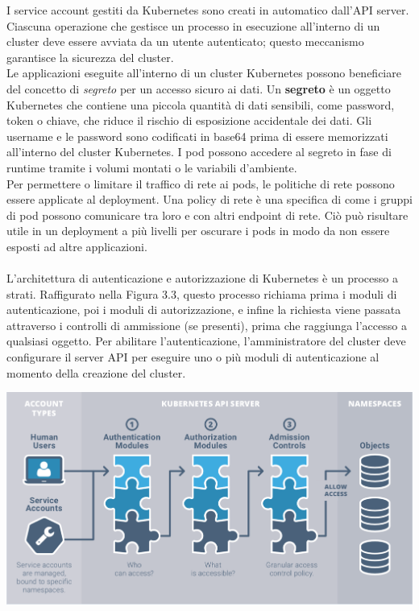 \documentclass[12pt, a4paper]{report}
\begin{document}
I service account gestiti da Kubernetes sono creati in automatico dall'API server. Ciascuna operazione che gestisce un processo in esecuzione all'interno di un cluster deve essere avviata da un utente autenticato; questo meccanismo garantisce la sicurezza del cluster.\\
Le applicazioni eseguite all'interno di un cluster Kubernetes possono beneficiare del concetto di \textit{segreto} per un accesso sicuro ai dati. Un \textbf{segreto} è un oggetto Kubernetes che contiene una piccola quantità di dati sensibili, come password, token o chiave, che riduce il rischio di esposizione accidentale dei dati. Gli username e le password sono codificati in base64 prima di essere memorizzati all'interno del cluster Kubernetes. I pod possono accedere al segreto in fase di runtime tramite i volumi montati o le variabili d'ambiente.\\
Per permettere o limitare il traffico di rete ai pods, le politiche di rete possono essere applicate al deployment. Una policy di rete è una specifica di come i gruppi di pod possono comunicare tra loro e con altri endpoint di rete. Ciò può risultare utile in un deployment a più livelli per oscurare i pods in modo da non essere esposti ad altre applicazioni.\\
\\
L'architettura di autenticazione e autorizzazione di Kubernetes è un processo a strati. Raffigurato nella Figura 3.3, questo processo richiama prima i moduli di autenticazione, poi i moduli di autorizzazione, e infine la richiesta viene passata attraverso i controlli di ammissione (se presenti), prima che raggiunga l'accesso a qualsiasi oggetto. Per abilitare l'autenticazione, l'amministratore del cluster deve configurare il server API per eseguire uno o più moduli di autenticazione al momento della creazione del cluster.\\
\begin{center}
  \includegraphics[width=\linewidth]{Images/Kubernetes-auth}\\
\end{center}
\end{document}
